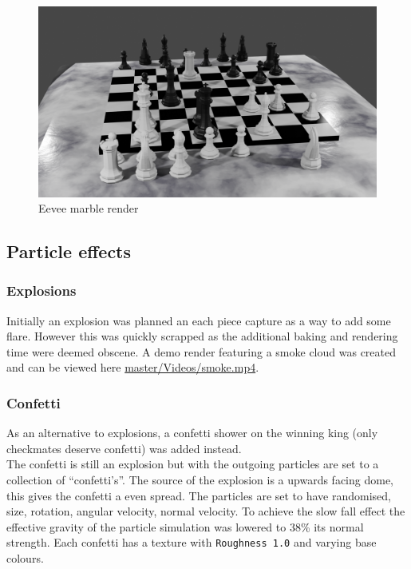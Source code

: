 \documentclass[11pt]{article}
\begin{document}
\begin{figure}[htbp]
\centering
\includegraphics[width=\textwidth]{Images/Marble eevee.png}
\caption{Eevee marble render}
\end{figure}
\newpage
\subsection{Particle effects}
\label{sec:org62c1aed}
\subsubsection{Explosions}
\label{sec:org325aa69}
Initially an explosion was planned an each piece capture as a way to add some
flare. However this was quickly scrapped as the additional baking and rendering time
were deemed obscene. A demo render featuring a smoke cloud was created and can
be viewed here \href{https://github.com/Jake-Moss/blender-chess/blob/master/Videos/smoke.mp4}{master/Videos/smoke.mp4}.
\subsubsection{Confetti}
\label{sec:org4e12650}
As an alternative to explosions, a confetti shower on the winning king (only
checkmates deserve confetti) was added instead.\\

The confetti is still an explosion but with the outgoing particles are set to a
collection of ``confetti's''. The source of the explosion is a upwards facing
dome, this gives the confetti a even spread. The particles are set to have
randomised, size, rotation, angular velocity, normal velocity. To achieve the
slow fall effect the effective gravity of the particle simulation was lowered to
38\% its normal strength. Each confetti has a texture with \texttt{Roughness 1.0} and
varying base colours.
\end{document}
